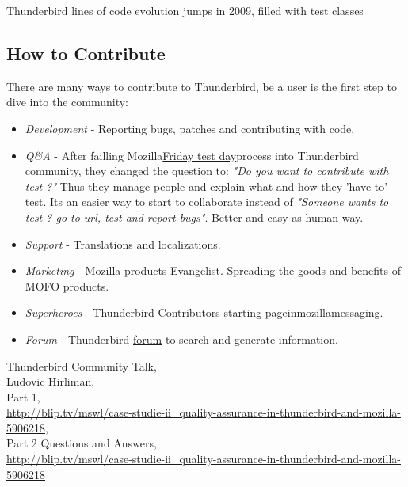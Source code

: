 \documentclass[11pt]{scrartcl}
\begin{document}
Thunderbird lines of code evolution jumps in 2009, filled with test classes

\subsection{How to Contribute}

There are many ways to contribute to Thunderbird, be a user is the first step to dive into the community:

\begin{itemize}
	\item \textit{Development} - Reporting bugs, patches and contributing with code.
	\item \textit{Q\&A} - After failling Mozilla\href{https://quality.mozilla.org/2013/03/mozilla-org-test-day/}{Friday test day}process into Thunderbird community, they changed the question to: \textit{"Do you want to contribute with test ?"} Thus they manage people and explain what and how they 'have to' test. Its an easier way to start to collaborate instead of \textit{"Someone wants to test ? go to url, test and report bugs"}. Better and easy as human way.
	\item \textit{Support} - Translations and localizations.
	\item \textit{Marketing} - Mozilla products Evangelist. Spreading the goods and benefits of MOFO products.
	\item \textit{Superheroes} - Thunderbird Contributors \href{https://support.mozillamessaging.com/es/kb/buscamos-superhroes}{starting page}inmozillamessaging.
	\item \textit{Forum} - Thunderbird \href{https://getsatisfaction.com/mozilla_messaging/}{forum} to search and generate information.
\end{itemize}

\begin{thebibliography}{9}

    Thunderbird Community Talk,\\
    Ludovic Hirliman,\\  
    Part 1,\\
    \url{http://blip.tv/mswl/case-studie-ii_quality-assurance-in-thunderbird-and-mozilla-5906218},\\
    Part 2 Questions and Answers,\\
    \url{http://blip.tv/mswl/case-studie-ii_quality-assurance-in-thunderbird-and-mozilla-5906218}

\end{thebibliography}
\end{document}
